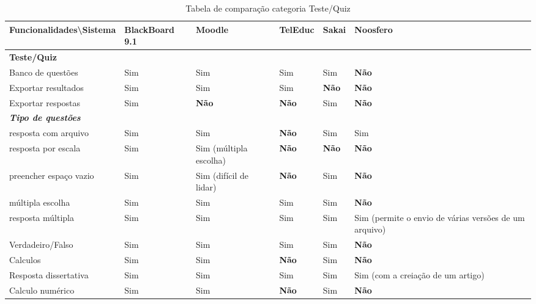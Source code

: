 \begin{landscape}
\begin{table}[H]
\begin{tabular}{|@{}p{5.5cm}|p{3.5cm}|p{3.5cm}|p{3.5cm}|p{3.5cm}|p{3.5cm}@{}|}
\hline
\textbf{Funcionalidades\textbackslash Sistema} & \textbf{BlackBoard 9.1} & \textbf{Moodle} & \textbf{TelEduc} & \textbf{Sakai} & \textbf{Noosfero}\\ \hline
\textbf{Teste/Quiz} &  &  &  &  &  \\
Banco de questões & Sim & Sim & Sim & Sim & \textbf{Não}  \\
Exportar resultados & Sim & Sim & Sim & \textbf{Não}  & \textbf{Não}  \\
Exportar respostas & Sim & \textbf{Não}  & \textbf{Não}  & Sim & \textbf{Não}  \\
\textit{\textbf{Tipo de questões}} &  &  &  &  &  \\
resposta com arquivo & Sim & Sim & \textbf{Não}  & Sim & Sim \\
resposta por escala & Sim & Sim {\tiny (múltipla escolha)} & \textbf{Não}  & \textbf{Não}  & \textbf{Não}  \\
preencher espaço vazio & Sim & Sim {\tiny (difícil de lidar)} & \textbf{Não}  & Sim & \textbf{Não}  \\
múltipla escolha & Sim & Sim & Sim & Sim & \textbf{Não}  \\
resposta múltipla & Sim & Sim & Sim & Sim & Sim {\tiny(permite o envio de várias versões de um arquivo)} \\
Verdadeiro/Falso & Sim & Sim & Sim & Sim & \textbf{Não}  \\
Calculos & Sim & Sim & \textbf{Não}  & Sim & \textbf{Não}  \\
Resposta dissertativa & Sim & Sim & Sim & Sim & Sim {\tiny (com a creiação de um artigo)} \\
Calculo numérico & Sim & Sim & \textbf{Não}  & Sim & \textbf{Não}  \\ \hline
\end{tabular}
\caption{Tabela de comparação categoria Teste/Quiz}
\label{tab:teste}
\end{table}


\end{landscape}
